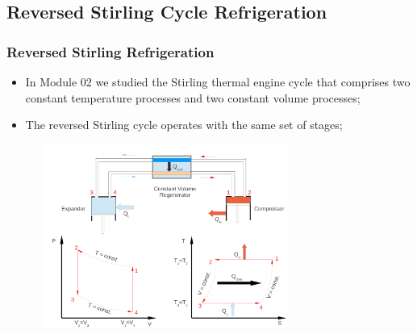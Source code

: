 \documentclass[10pt,compress]{beamer}
\begin{document}
\subsection{Reversed Stirling Cycle Refrigeration}
\begin{frame}
 \frametitle{Reversed Stirling Refrigeration}
  \begin{itemize}
   \item <1-> In Module 02 we studied the Stirling thermal engine cycle that comprises two constant temperature processes and two constant volume processes;
   \item <2-> The reversed Stirling cycle operates with the same set of stages;
  \end{itemize}

    \begin{figure}%
     \begin{center}
      \includegraphics[width=8.3cm,height=6.0cm]{./Pics/Overview_Refrig9}
     \end{center}
    \end{figure}  

\end{frame}
\end{document}
